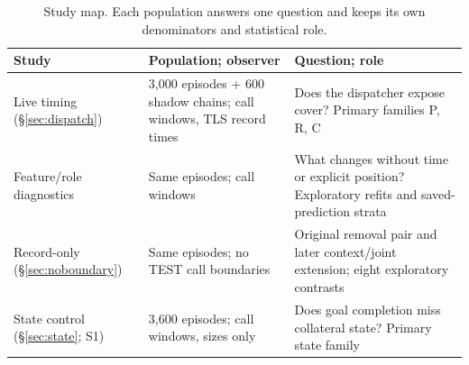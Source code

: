 \begin{table}[t]\centering\footnotesize
\caption{Study map. Each population answers one question and keeps its own denominators and statistical role.}\label{tab:study-map}
\setlength{\tabcolsep}{3pt}
\begin{tabularx}{\columnwidth}{@{}P{.2\columnwidth}P{.25\columnwidth}Y@{}}\toprule
Study & Population; observer & Question; role \\\midrule
Live timing (\S\ref{sec:dispatch}) & 3,000 episodes + 600 shadow chains; call windows, TLS record times & Does the dispatcher expose cover? Primary families P, R, C \\\addlinespace[2pt]
Feature/role diagnostics & Same episodes; call windows & What changes without time or explicit position? Exploratory refits and saved-prediction strata \\\addlinespace[2pt]
Record-only (\S\ref{sec:noboundary}) & Same episodes; no TEST call boundaries & Original removal pair and later context/joint extension; eight exploratory contrasts \\\addlinespace[2pt]
State control (\S\ref{sec:state}; S1) & 3,600 episodes; call windows, sizes only & Does goal completion miss collateral state? Primary state family \\\bottomrule
\end{tabularx}\end{table}
